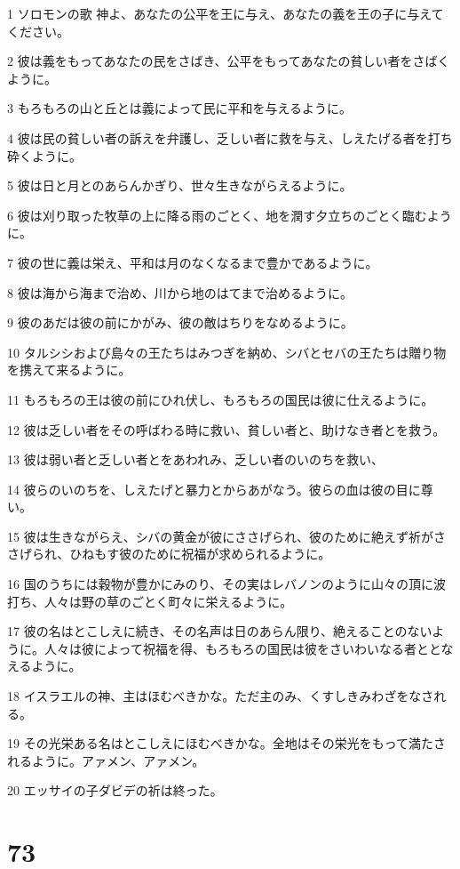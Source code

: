\par 1 ソロモンの歌 神よ、あなたの公平を王に与え、あなたの義を王の子に与えてください。
\par 2 彼は義をもってあなたの民をさばき、公平をもってあなたの貧しい者をさばくように。
\par 3 もろもろの山と丘とは義によって民に平和を与えるように。
\par 4 彼は民の貧しい者の訴えを弁護し、乏しい者に救を与え、しえたげる者を打ち砕くように。
\par 5 彼は日と月とのあらんかぎり、世々生きながらえるように。
\par 6 彼は刈り取った牧草の上に降る雨のごとく、地を潤す夕立ちのごとく臨むように。
\par 7 彼の世に義は栄え、平和は月のなくなるまで豊かであるように。
\par 8 彼は海から海まで治め、川から地のはてまで治めるように。
\par 9 彼のあだは彼の前にかがみ、彼の敵はちりをなめるように。
\par 10 タルシシおよび島々の王たちはみつぎを納め、シバとセバの王たちは贈り物を携えて来るように。
\par 11 もろもろの王は彼の前にひれ伏し、もろもろの国民は彼に仕えるように。
\par 12 彼は乏しい者をその呼ばわる時に救い、貧しい者と、助けなき者とを救う。
\par 13 彼は弱い者と乏しい者とをあわれみ、乏しい者のいのちを救い、
\par 14 彼らのいのちを、しえたげと暴力とからあがなう。彼らの血は彼の目に尊い。
\par 15 彼は生きながらえ、シバの黄金が彼にささげられ、彼のために絶えず祈がささげられ、ひねもす彼のために祝福が求められるように。
\par 16 国のうちには穀物が豊かにみのり、その実はレバノンのように山々の頂に波打ち、人々は野の草のごとく町々に栄えるように。
\par 17 彼の名はとこしえに続き、その名声は日のあらん限り、絶えることのないように。人々は彼によって祝福を得、もろもろの国民は彼をさいわいなる者ととなえるように。
\par 18 イスラエルの神、主はほむべきかな。ただ主のみ、くすしきみわざをなされる。
\par 19 その光栄ある名はとこしえにほむべきかな。全地はその栄光をもって満たされるように。アァメン、アァメン。
\par 20 エッサイの子ダビデの祈は終った。

\chapter{73}

